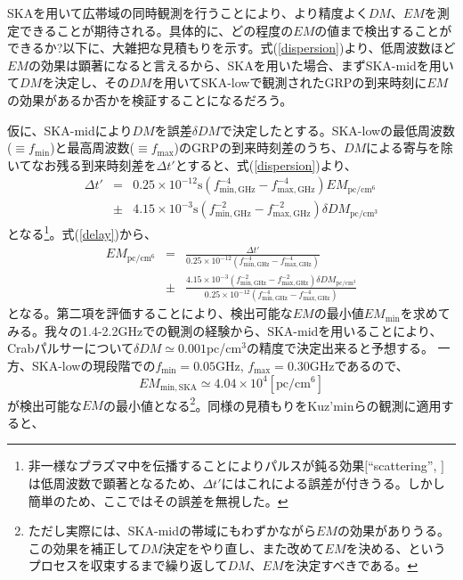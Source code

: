 SKAを用いて広帯域の同時観測を行うことにより、より精度よく$DM$、$EM$を測定できることが期待される。具体的に、どの程度の$EM$の値まで検出することができるか?以下に、大雑把な見積もりを示す。式(\ref{dispersion})より、低周波数ほど$EM$の効果は顕著になると言えるから、SKAを用いた場合、まずSKA-midを用いて$DM$を決定し、その$DM$を用いてSKA-lowで観測されたGRPの到来時刻に$EM$の効果があるか否かを検証することになるだろう。

仮に、SKA-midにより$DM$を誤差$\delta DM$で決定したとする。SKA-lowの最低周波数($\equiv f_{\mathrm{min}}$)と最高周波数($\equiv f_{\mathrm{max}}$)のGRPの到来時刻差のうち、$DM$による寄与を除いてなお残る到来時刻差を$\Delta t'$とすると、式(\ref{dispersion})より、
\begin{eqnarray}
\label{delay}
\Delta t'&=& 0.25 \times 10^{-12} \mathrm{s} \left(f_{\mathrm{min},\mathrm{GHz}}^{-4}-f_{\mathrm{max},\mathrm{GHz}}^{-4}\right)EM_{\mathrm{pc/cm^{6}}} \\ \nonumber
&\pm& 4.15 \times 10^{-3} \mathrm{s} \left(f_{\mathrm{min},\mathrm{GHz}}^{-2}-f_{\mathrm{max},\mathrm{GHz}}^{-2}\right)\delta DM_{\mathrm{pc/cm^{3}}} 
\end{eqnarray}
となる\footnote{非一様なプラズマ中を伝播することによりパルスが鈍る効果$[$``scattering'', \cite{LK04}$]$は低周波数で顕著となるため、$\Delta t'$にはこれによる誤差が付きうる。しかし簡単のため、ここではその誤差を無視した。}。式(\ref{delay})から、
\begin{eqnarray}
EM_{\mathrm{pc/cm^{6}}}&=&\frac{\Delta t'}{0.25 \times 10^{-12} \left(f_{\mathrm{min},\mathrm{GHz}}^{-4}-f_{\mathrm{max},\mathrm{GHz}}^{-4}\right)} \\ \nonumber
&\pm&\frac{4.15 \times 10^{-3} \left(f_{\mathrm{min},\mathrm{GHz}}^{-2}-f_{\mathrm{max},\mathrm{GHz}}^{-2}\right)\delta DM_{\mathrm{pc/cm^{3}}}}{0.25 \times 10^{-12} \left(f_{\mathrm{min},\mathrm{GHz}}^{-4}-f_{\mathrm{max},\mathrm{GHz}}^{-4}\right)}
\end{eqnarray}
となる。第二項を評価することにより、検出可能な$EM$の最小値$EM_{\mathrm{min}}$を求めてみる。我々の1.4-2.2GHzでの観測の経験から、SKA-midを用いることにより、Crabパルサーについて$\delta DM\simeq0.001$pc/cm$^{3}$の精度で決定出来ると予想する。
一方、SKA-lowの現段階での$f_{\mathrm{min}}=0.05$GHz, $f_{\mathrm{max}}=0.30$GHzであるので、
\begin{equation}
EM_{\mathrm{min, SKA}}\simeq4.04\times10^{4} [\mathrm{pc/cm^{6}}]
\end{equation}
が検出可能な$EM$の最小値となる\footnote{ただし実際には、SKA-midの帯域にもわずかながら$EM$の効果がありうる。この効果を補正して$DM$決定をやり直し、また改めて$EM$を決める、というプロセスを収束するまで繰り返して$DM、EM$を決定すべきである。}。同様の見積もりをKuz'minらの観測に適用すると、
